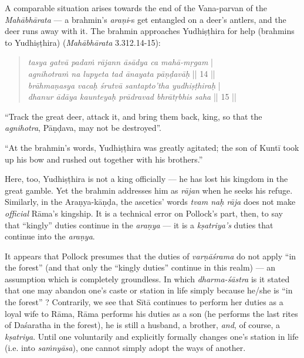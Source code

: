 A comparable situation arises towards the end of the Vana-parvan of the {\sl Mahābhārata} --- a brahmin’s {\sl araṇi}-s get entangled on a deer’s antlers, and the deer runs away with it. The brahmin approaches Yudhiṣṭhira for help (brahmins to Yudhiṣṭhira) ({\sl Mahābhārata} 3.312.14-15): 

\begin{quote}
{{\sl tasya gatvā padaṁ rājann āsādya ca mahā-mṛgam}} |\\
{\sl agnihotraṁ na lupyeta tad ānayata pāṇḍavāḥ} || 14 ||\\
{\sl brāhmaṇasya vacaḥ śrutvā santapto’tha yudhiṣṭhiraḥ} |\\
{\sl dhanur ādāya kaunteyaḥ prādravad bhrātṛbhis saha} || 15 ||
\end{quote}


\begin{myquote}
“Track the great deer, attack it, and bring them back, king, so that the {\sl agnihotra}, Pāṇḍava, may not be destroyed”.

“At the brahmin’s words, Yudhiṣṭhira was greatly agitated; the son of Kuntī took up his bow and rushed out together with his brothers.”
\end{myquote}

Here, too, Yudhiṣṭhira is not a king officially --- he has lost his kingdom in the great gamble. Yet the brahmin addresses him as {\sl rājan} when he seeks his refuge. Similarly, in the Araṇya-kāṇḍa, the ascetics’ words {\sl tvam naḥ rāja} does not make {\sl official} Rāma’s kingship. It is a technical error on Pollock’s part, then, to say that “kingly” duties continue in the {\sl araṇya} --- it is a {\sl kṣatriya’s} duties that continue into the {\sl araṇya}.

It appears that Pollock presumes that the duties of {\sl varṇāśrama} do not apply “in the forest” (and that only the “kingly duties” continue in this realm) --- an assumption which is completely groundless. In which {\sl dharma-śāstra} is it stated that one may abandon one’s caste or station in life simply because he/she is “in the forest” ? Contrarily, we see that Sītā continues to perform her duties as a loyal wife to Rāma, Rāma performs his duties as a son (he performs the last rites of Daśaratha in the forest), he is still a husband, a brother, {\sl and}, of course, a {\sl kṣatriya}. Until one voluntarily and explicitly formally changes one’s station in life (i.e. into {\sl saṁnyāsa}), one cannot simply adopt the ways of another. 

